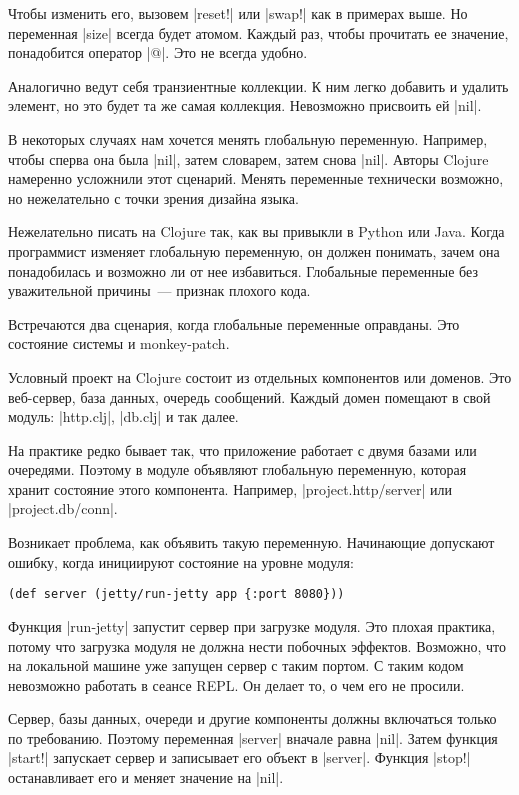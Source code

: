 Чтобы изменить его, вызовем \spverb|reset!| или \spverb|swap!| как в примерах выше. Но
переменная \spverb|size| всегда будет атомом. Каждый раз, чтобы прочитать ее значение,
понадобится оператор \spverb|@|. Это не всегда удобно.

Аналогично ведут себя транзиентные коллекции. К ним легко добавить и удалить
элемент, но это будет та же самая коллекция. Невозможно присвоить ей \spverb|nil|.

В некоторых случаях нам хочется менять глобальную переменную. Например, чтобы
сперва она была \spverb|nil|, затем словарем, затем снова \spverb|nil|. Авторы Clojure
намеренно усложнили этот сценарий. Менять переменные технически возможно, но
нежелательно с точки зрения дизайна языка.

Нежелательно писать на Clojure так, как вы привыкли в Python или Java. Когда
программист изменяет глобальную переменную, он должен понимать, зачем она
понадобилась и возможно ли от нее избавиться. Глобальные переменные без
уважительной причины~--- признак плохого кода.

Встречаются два сценария, когда глобальные переменные оправданы. Это состояние
системы и monkey-patch.

Условный проект на Clojure состоит из отдельных компонентов или доменов. Это
веб-сервер, база данных, очередь сообщений. Каждый домен помещают в свой модуль:
\spverb|http.clj|, \spverb|db.clj| и так далее.

На практике редко бывает так, что приложение работает с двумя базами или
очередями. Поэтому в модуле объявляют глобальную переменную, которая хранит
состояние этого компонента. Например, \spverb|project.http/server| или
\spverb|project.db/conn|.

Возникает проблема, как объявить такую переменную. Начинающие допускают ошибку,
когда инициируют состояние на уровне модуля:

\begin{verbatim}
(def server (jetty/run-jetty app {:port 8080}))
\end{verbatim}

Функция \spverb|run-jetty| запустит сервер при загрузке модуля. Это плохая практика,
потому что загрузка модуля не должна нести побочных эффектов. Возможно, что на
локальной машине уже запущен сервер с таким портом. С таким кодом невозможно
работать в сеансе REPL. Он делает то, о чем его не просили.

Сервер, базы данных, очереди и другие компоненты должны включаться только по
требованию. Поэтому переменная \spverb|server| вначале равна \spverb|nil|. Затем функция
\spverb|start!| запускает сервер и записывает его объект в \spverb|server|. Функция \spverb|stop!|
останавливает его и меняет значение на \spverb|nil|.

